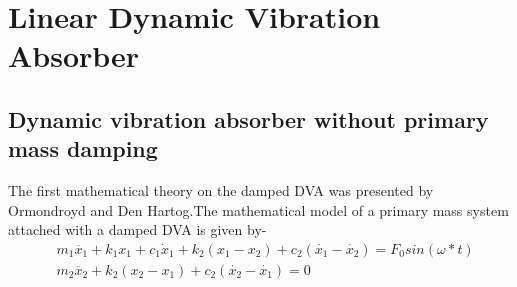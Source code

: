 \chapter{Linear Dynamic Vibration Absorber}
\section{Dynamic vibration absorber without primary mass damping}
The first mathematical theory on the damped DVA was presented by Ormondroyd and Den Hartog.The mathematical model of a primary mass system attached with a damped DVA is given by-
\begin{align}
&m_1\ddot{x_1}+k_1x_1+c_1 \dot x_1 + k_2(x_1-x_2)+c_2(\dot{x_1}-\dot{x_2})=F_0sin(\omega *t) \\
&m_2\ddot{x_2}+k_2(x_2-x_1)+c_{2}(\dot{x_{2}}-\dot{x_{1}})=0
\end{align}

